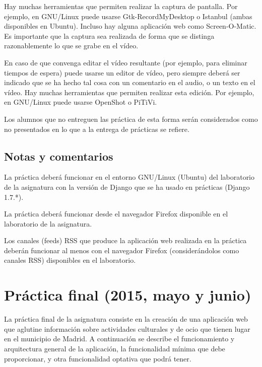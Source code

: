 Hay muchas herramientas que permiten realizar la captura de pantalla. Por ejemplo, en GNU/Linux puede usarse Gtk-RecordMyDesktop o Istanbul (ambas disponibles en Ubuntu). Incluso hay alguna aplicación web como Screen-O-Matic. Es importante que la captura sea realizada de forma que se distinga razonablemente lo que se grabe en el vídeo.

En caso de que convenga editar el vídeo resultante (por ejemplo, para eliminar tiempos de espera) puede usarse un editor de vídeo, pero siempre deberá ser indicado que se ha hecho tal cosa con un comentario en el audio, o un texto en el vídeo. Hay muchas herramientas que permiten realizar esta edición. Por ejemplo, en GNU/Linux puede usarse OpenShot o PiTiVi.

Los alumnos que no entreguen las práctica de esta forma serán considerados como no presentados en lo que a la entrega de prácticas se refiere.

\subsection{Notas y comentarios}

La práctica deberá funcionar en el entorno GNU/Linux (Ubuntu) del laboratorio de la asignatura con la versión de Django que se ha usado en prácticas (Django 1.7.*).

La práctica deberá funcionar desde el navegador Firefox disponible en el laboratorio de la asignatura.

Los canales (feeds) RSS que produce la aplicación web realizada en la práctica deberán funcionar al menos con el navegador Firefox (considerándolos como canales RSS) disponibles en el laboratorio.

\newpage

\section{Práctica final (2015, mayo y junio)}
\label{practica-final-2015-05}

La práctica final de la asignatura consiste en la creación de una aplicación web que aglutine información sobre actividades culturales y de ocio que tienen lugar en el municipio de Madrid. A continuación se describe el funcionamiento y arquitectura general de la aplicación, la funcionalidad mínima que debe proporcionar, y otra funcionalidad optativa que podrá tener.

